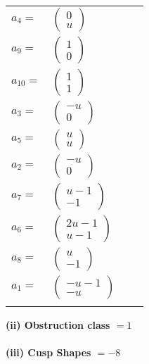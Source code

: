 \documentclass[1p]{elsarticle_modified}
\theoremstyle{definition}
\begin{document}
\begin{tabular}{m{7pt} m{180pt} m{7pt} m{180pt} }
\flushright $a_{4}=$&$\begin{pmatrix}0\\u\end{pmatrix}$ \\
\flushright $a_{9}=$&$\begin{pmatrix}1\\0\end{pmatrix}$ \\
\flushright $a_{10}=$&$\begin{pmatrix}1\\1\end{pmatrix}$ \\
\flushright $a_{3}=$&$\begin{pmatrix}- u\\0\end{pmatrix}$ \\
\flushright $a_{5}=$&$\begin{pmatrix}u\\u\end{pmatrix}$ \\
\flushright $a_{2}=$&$\begin{pmatrix}- u\\0\end{pmatrix}$ \\
\flushright $a_{7}=$&$\begin{pmatrix}u-1\\-1\end{pmatrix}$ \\
\flushright $a_{6}=$&$\begin{pmatrix}2 u-1\\u-1\end{pmatrix}$ \\
\flushright $a_{8}=$&$\begin{pmatrix}u\\-1\end{pmatrix}$ \\
\flushright $a_{1}=$&$\begin{pmatrix}- u-1\\- u\end{pmatrix}$\\&\end{tabular}
\flushleft \textbf{(ii) Obstruction class $= 1$}\\~\\
\flushleft \textbf{(iii) Cusp Shapes $= -8$}\\~\\
\end{document}
